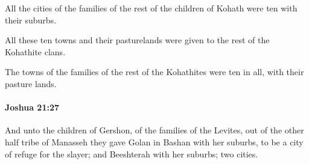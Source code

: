 			\begin{versebox}
					\item[BHS] 
					\item[ASV] All the cities of the families of the rest of the children of Kohath were ten with their suburbs.
					\item[NIV] All these ten towns and their pasturelands were given to the rest of the Kohathite clans.
					\item[NRSV] The towns of the families of the rest of the Kohathites were ten in all, with their pasture lands.
			\end{versebox}

		\paragraph{Joshua 21:27} %
			\label{JOSHUA-21-27}

			And unto the children of Gershon, of the families of the Levites, out of the other half tribe of Manasseh they gave Golan in Bashan with her suburbs, to be a city of refuge for the slayer; and Beeshterah with her suburbs; two cities.

